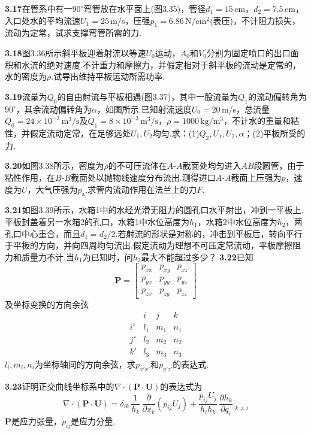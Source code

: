 \medskip
\noindent\textbf{3.17}\quad 在管系中有一$90^{\circ}$弯管放在水平面上(图3.35)，管径$d_1=15\,$cm，$d_2=7.5\,$cm，入口处水的平均流速$U_1=25\,$m/s，压强$p_1=6.86\,\mathrm{N/cm^2}$(表压)，不计阻力损失，流动为定常，试求支撑弯管所需的力.

\medskip
\noindent\textbf{3.18}\quad 图3.36所示斜平板迎着射流以等速$U_0$运动，$A_0$和$V_0$分别为固定喷口的出口面积和水流的绝对速度.不计重力和摩擦力，并假定相对于斜平板的流动是定常的，水的密度为$\rho$.试导出维持平板运动所需功率.

\medskip
\noindent\textbf{3.19}\quad 流量为$Q_0$的自由射流与平板相遇(图3.37)，其中一股流量为$Q_1$的流动偏转角为$90^{\circ}$，其余流动偏转角为$\alpha$，如图所示.已知射流速度$U_0=20\,$m/s，总流量$Q_0=24\times 10^{-3}\,\mathrm{m^3/s}$及$Q_1=8\times 10^{-3}\,\mathrm{m^3/s}$，$\rho=1000\,\mathrm{kg/m^3}$，不计水的重量和粘性，并假定流动定常，在足够远处$U_1,U_2$均匀.求：(1)$Q_2,U_1,U_2,\alpha$；(2)平板所受的力.

\medskip
\noindent\textbf{3.20}\quad 如图3.38所示，密度为$\rho$的不可压流体在$A$-$A$截面处均匀进入$AB$段圆管，由于粘性作用，在$B$-$B$截面处以抛物线速度分布流出.测得进口$A$-$A$截面上压强为$p$，速度为$U$，大气压强为$p_{\mathrm{a}}$.求管内流动作用在法兰上的力$F$.

\medskip
\noindent\textbf{3.21}\quad 如图3.39所示，水箱1中的水经光滑无阻力的圆孔口水平射出，冲到一平板上.平板封盖着另一水箱2的孔口，水箱1中水位高度为$h_1$，水箱2中水位高度为$h_2$，两孔口中心重合，而且$d_1=d_2/2$.若射流的形状是对称的，冲击到平板后，转向平行于平板的方向，并向四周均匀流出.假定流动为理想不可压定常流动，平板摩擦阻力和质量力不计.当$h_1$为已知时，问$h_2$最大不能超过多少？
\medskip
\noindent\textbf{3.22}\quad 已知
\[
\boldsymbol{P}=\begin{bmatrix}
p_{xx} & p_{xy} & p_{xz}\\
p_{yx} & p_{yy} & p_{yz}\\
p_{zx} & p_{zy} & p_{zz}
\end{bmatrix}
\]
及坐标变换的方向余弦
\[
\begin{array}{c|ccc}
 & i & j & k\\ \hline
i' & l_1 & m_1 & n_1\\
j' & l_2 & m_2 & n_2\\
k' & l_3 & m_3 & n_3
\end{array}
\]
$l_i,m_i,n_i$为坐标轴间的方向余弦，求$p_{x'x'}$和$p_{y'z'}$的表达式.

\medskip
\noindent\textbf{3.23}\quad 证明正交曲线坐标系中的$\nabla\cdot(\boldsymbol{P}\cdot\boldsymbol{U})$的表达式为
\[
\nabla\cdot(\boldsymbol{P}\cdot\boldsymbol{U})=\delta_{ik}\,\frac{1}{h_k}\,\frac{\partial}{\partial x_k}(p_{ij}U_j)+\frac{p_{ij}U_j}{h_ih_k}\,\frac{\partial h_k}{\partial q_i}\bigg|_{k\neq i}
\]
$\boldsymbol{P}$是应力张量，$p_{ij}$是应力分量.

